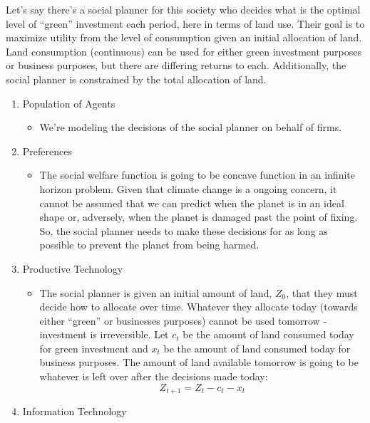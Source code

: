\documentclass[12pt]{article}
\begin{document}
Let's say there's a social planner for this society who decides what is the optimal level of \enquote{green} investment each period, here in terms of land use. Their goal is to maximize utility from the level of consumption given an initial allocation of land. Land consumption (continuous) can be used for either green investment purposes or business purposes, but there are differing returns to each. Additionally, the social planner is constrained by the total allocation of land. \\
\begin{enumerate}
	\item Population of Agents
	\begin{itemize}
		\item We're modeling the decisions of the social planner on behalf of firms.
	\end{itemize}
	\item Preferences	
	\begin{itemize}
		\item The social welfare function is going to be concave function in an infinite horizon problem. Given that climate change is a ongoing concern, it cannot be assumed that we can predict when the planet is in an ideal shape or, adversely, when the planet is damaged past the point of fixing. So, the social planner needs to make these decisions for as long as possible to prevent the planet from being harmed. 
	\end{itemize}
	\item Productive Technology
	\begin{itemize}
		\item The social planner is given an initial amount of land, \(Z_0\), that they must decide how to allocate over time. Whatever they allocate today (towards either \enquote{green} or businesses purposes) cannot be used tomorrow - investment is irreversible. Let \(c_t\) be the amount of land consumed today for green investment and \(x_t\) be the amount of land consumed today for business purposes. The amount of land available tomorrow is going to be whatever is left over after the decisions made today:  
		\begin{equation}
			Z_{t+1} = Z_t - c_t - x_t
		\end{equation}
	\end{itemize}
\newpage
	\item Information Technology
	\begin{itemize}

\end{itemize}
\end{enumerate}
\end{document}
